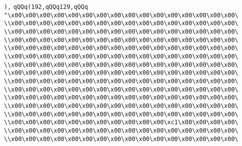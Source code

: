 \verb|),|\newline
\verb|qQQq(192,qQQq129,qQQq|\newline
\verb|"\x00\x00\x00\x00\x00\x00\x00\x00\x00\x00\x00\x00\x00\x00\x00\x00\|\newline
\verb|\\x00\x00\x00\x00\x00\x00\x00\x00\x00\x00\x00\x00\x00\x00\x00\x00\|\newline
\verb|\\x00\x00\x00\x00\x00\x00\x00\x00\x00\x00\x00\x00\x00\x00\x00\x00\|\newline
\verb|\\x00\x00\x00\x00\x00\x00\x00\x00\x00\x00\x00\x00\x00\x00\x00\x00\|\newline
\verb|\\x00\x00\x00\x00\x00\x00\x00\x00\x00\x00\x00\x00\x00\x00\x00\x00\|\newline
\verb|\\x00\x00\x00\x00\x00\x00\x00\x00\x00\x00\x00\x00\x00\x00\x00\x00\|\newline
\verb|\\x00\x00\x00\x00\x00\x00\x00\x00\x00\x00\x00\x00\x00\x00\x00\x00\|\newline
\verb|\\x00\x00\x00\x00\x00\x00\x00\x00\x00\x00\x00\x00\x00\x00\x00\x00\|\newline
\verb|\\x00\x00\x00\x00\x00\x00\x00\x00\x00\x00\x00\x00\x00\x00\x00\x00\|\newline
\verb|\\x00\x00\x00\x00\x00\x00\x00\x00\x00\x00\x00\x00\x00\x00\x00\x00\|\newline
\verb|\\x00\x00\x00\x00\x00\x00\x00\x00\x00\x00\x00\x00\x00\x00\x00\x00\|\newline
\verb|\\x00\x00\x00\x00\x00\x00\x00\x00\x00\x00\x00\x00\x00\x00\x00\x00\|\newline
\verb|\\x00\x00\x00\x00\x00\x00\x00\x00\x00\x00\x00\x00\x00\x00\x00\x00\|\newline
\verb|\\x00\x00\x00\x00\x00\x00\x00\x00\x00\x00\x00\xc1\x00\x00\x00\x00\|\newline
\verb|\\x00\x00\x00\x00\x00\x00\x00\x00\x00\x00\x00\x00\x00\x00\x00\x00\|\newline
\verb|\\x00\x00\x00\x00\x00\x00\x00\x00\x00\x00\x00\x00\x00\x00\x00\x00\|\newline
